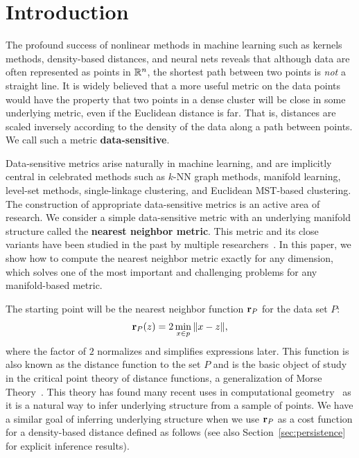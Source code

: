\section{Introduction}

The profound success of nonlinear methods in machine learning such as kernels methods, density-based distances, and neural nets reveals that although data are often represented as points in $\mathbb{R}^n$, the shortest path between two points is \emph{not} a straight line.
It is widely believed that a more useful metric on the data points would have the property that two points in a dense cluster will be close in some underlying metric, even if the Euclidean distance is far.
That is, distances are scaled inversely according to the density of the data along a path between points.
We call such a metric \textbf{data-sensitive}.

Data-sensitive metrics arise naturally in machine learning, and are implicitly central in celebrated methods such as $k$-NN graph methods, manifold learning, level-set methods, single-linkage clustering, and Euclidean MST-based clustering.
The construction of appropriate data-sensitive metrics is an active area of research.
We consider a simple data-sensitive metric with an underlying manifold structure called the \textbf{nearest neighbor metric}.
This metric and its close variants have been studied in the past by multiple researchers~\cite{bijral11semiSupLearningDBD,vincent03,sajama05estimatingDBDM}.
In this paper, we show how to compute the nearest neighbor metric exactly for any dimension, which solves one of the most important and challenging problems for any manifold-based metric.

The starting point will be the nearest neighbor function $\mathbf{r}_P$ for the data set $P$:
\[
\mathbf{r}_P(z) = 2\min_{x\in p} \|x-z\|,
\]
where the factor of $2$ normalizes and simplifies expressions later.
This function is also known as the distance function to the set $P$ and is the basic object of study in the critical point theory of distance functions, a generalization of Morse Theory~\cite{grove93critical}.
This theory has found many recent uses in computational geometry~\cite{chazal08smooth,chazal09sampling} as it is a natural way to infer underlying structure from a sample of points.
We have a similar goal of inferring underlying structure when we use $\mathbf{r}_P$ as a cost function for a density-based distance defined as follows (see also Section~\ref{sec:persistence} for explicit inference results).

